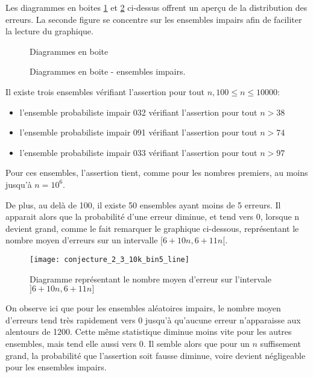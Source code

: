 \documentclass[../main.text]{report}
\begin{document}
Les diagrammes en boites \ref{fig:boxplots} et \ref{fig:boxplots_Odd} ci-dessus offrent un aperçu de la distribution des erreurs. La seconde figure se concentre sur les ensembles impairs afin de faciliter la lecture du graphique.

\begin{figure}[H]
\centering
	\caption{Diagrammes en boite}
	\label{fig:boxplots}
\end{figure}

\begin{figure}[H]
\centering
	\caption{Diagrammes en boite - ensembles impairs.}
	\label{fig:boxplots_Odd}
\end{figure}

Il existe trois ensembles vérifiant l'assertion pour tout $n, 100 \leq n \leq 10000$:
\begin{itemize}
	\item l'ensemble probabiliste impair 032 vérifiant l'assertion pour tout $n > 38$
	\item l'ensemble probabiliste impair 091 vérifiant l'assertion pour tout $n > 74$
	\item l'ensemble probabiliste impair 033 vérifiant l'assertion pour tout $n > 97$
\end{itemize}
Pour ces ensembles, l'assertion tient, comme pour les nombres premiers, au moins jusqu'à $n=10^6$.  

De plus, au delà de 100, il existe 50 ensembles ayant moins de 5 erreurs. 
Il apparait alors que la probabilité d'une erreur diminue, et tend vers 0, lorsque n devient grand, comme le fait remarquer le graphique ci-dessous, représentant le nombre moyen d'erreurs sur un intervalle $[6+10n, 6+11n[$.
\begin{figure}[H]
\centering
\texttt{[image: conjecture\_2\_3\_10k\_bin5\_line]}
\caption{Diagramme représentant le nombre moyen d'erreur sur l'intervale $]6+10n, 6+11n]$}
\label{fig:conjecture_2_3_10k_bin5_line}
\end{figure}

On observe ici que pour les ensembles aléatoires impairs, le nombre moyen d'erreurs tend très rapidement vers 0 jusqu'à qu'aucune erreur n'apparaisse aux alentours de 1200. Cette même statistique diminue moins vite pour les autres ensembles, mais tend elle aussi vers 0.
Il semble alors que pour un $n$ suffisement grand, la probabilité que l'assertion soit fausse diminue, voire devient négligeable pour les ensembles impairs. 
\end{document}
